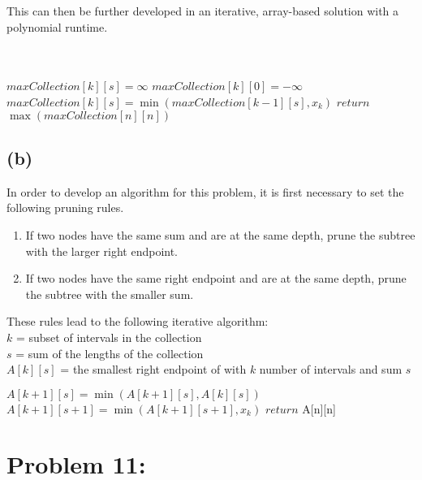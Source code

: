 \documentclass[12pt]{article}
\begin{document}
This can then be further developed in an iterative, array-based solution with a polynomial runtime.\\\\
\begin{algorithm}[H]
\Init\\
{
{$maxCollection[k][s] = \infty$}
}
{$maxCollection[k][0] = -\infty$}
\EndInit\\
{
{
{
{$maxCollection[k][s] = \min(maxCollection[k - 1][s], x_k)$}
}
}
}
{$return$ $\max(maxCollection[n][n])$}
\end{algorithm}
\subsection*{(b)}
In order to develop an algorithm for this problem, it is first necessary to set the following pruning rules.
\begin{enumerate}
    \item If two nodes have the same sum and are at the same depth, prune the subtree with the larger right endpoint.
    \item If two nodes have the same right endpoint and are at the same depth, prune the subtree with the smaller sum.
\end{enumerate}
These rules lead to the following iterative algorithm:\\
$k$ = subset of intervals in the collection\\
$s$ = sum of the lengths of the collection\\
$A[k][s]$ = the smallest right endpoint of with $k$ number of intervals and sum $s$\\
\begin{algorithm}[H]
{
{
{$A[k+1][s] = \min(A[k+1][s], A[k][s])$\\
$A[k+1][s+1] = \min(A[k+1][s+1], x_k)$}
}
}
{$return$ A[n][n]}
\end{algorithm}
\section*{Problem 11: }
\end{document}
